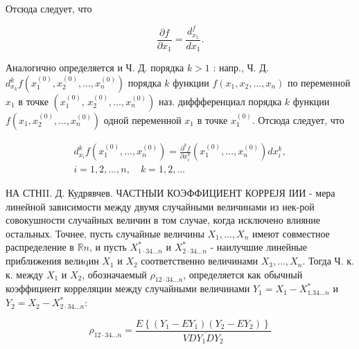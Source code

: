 \documentclass[10pt]{article}
\begin{document}
Отсюда следует, что



\[

\frac{\partial f}{\partial x_{1}}=\frac{d_{x_{1}}^{f}}{d x_{1}} .

\]



Аналогично определяется и Ч. Д. порядка $k>1$ : напр., Ч. Д. $d_{x_{k}}^{k} f\left(x_{1}^{(0)}, x_{2}^{(0)}, \ldots, x_{n}^{(0)}\right)$ порядка $k$ функции $f\left(x_{1}, x_{2}, \ldots, x_{n}\right)$ по переменной $x_{1}$ в точке $\left(x_{1}^{(0)}\right.$, $\left.x_{2}^{(0)}, \ldots, x_{n}^{(0)}\right)$ наз. диффференциал порядка $k$ функции $f\left(x_{1}, x_{2}^{(0)}, \ldots, x_{n}^{(0)}\right)$ одной переменной $x_{1}$ в точке $x_{1}^{(0)}$. Отсюда следует, что



\[

\begin{gathered}

d_{x_{i}}^{k} f\left(x_{1}^{(0)}, \ldots, x_{n}^{(0)}\right)=\frac{\partial^{k} f}{\partial x_{i}^{k}}\left(x_{1}^{(0)}, \ldots, x_{n}^{(0)}\right) d x_{i}^{k}, \\

i=1,2, \ldots, n, \quad k=1,2, \ldots

\end{gathered}

\]



НА СТНII. Д. Кудрявчев. ЧАСТНЫИ КОЭФФИЦИЕНТ КОРРЕЈЯ ІИИ - мера линейной зависимости между двумя случайными величинами из нек-рой совокушности случайных величин в том случае, когда исключено влияние остальных. Точнее, пусть случайные величины $X_{1}, \ldots, X_{n}$ имеют совместное распределение в $\mathbb{R} n$, и пусть $X_{1 \cdot 34 \ldots n}^{*}$ и $X_{2 \cdot 34 \ldots n}^{*}$ - наилучшие линейные приближения велиqин $X_{1}$ и $X_{2}$ соответственно величинами $X_{3}, \ldots, X_{n}$. Тогда Ч. к. к. между $X_{1}$ и $X_{2}$, обозначаемый $\rho_{12 \cdot 34 \ldots n}$, определяется как обычный коэффициент корреляции между случайными величинами $Y_{1}=X_{1}-X_{1.34 \ldots n}^{*}$ и $Y_{2}=X_{2}-X_{2 \cdot 34 \ldots n}^{*}:$



\[

\rho_{12 \cdot 34 \ldots n}=\frac{E\left\{\left(Y_{1}-E Y_{1}\right)\left(Y_{2}-E Y_{2}\right)\right\}}{V \overline{D Y_{1} D Y_{2}}}

\]
\end{document}
